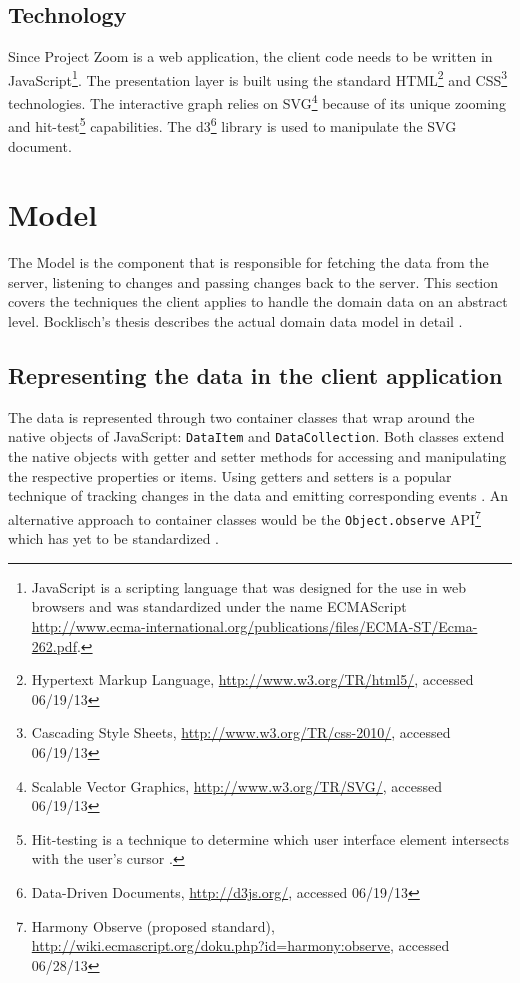 \subsection{Technology}
Since Project Zoom is a web application, the client code needs to be written in JavaScript\footnote{JavaScript is a scripting language that was designed for the use in web browsers and was standardized under the name ECMAScript \url{http://www.ecma-international.org/publications/files/ECMA-ST/Ecma-262.pdf}.}. The presentation layer is built using the standard HTML\footnote{Hypertext Markup Language, \url{http://www.w3.org/TR/html5/}, accessed 06/19/13} and CSS\footnote{Cascading Style Sheets, \url{http://www.w3.org/TR/css-2010/}, accessed 06/19/13} technologies. The interactive graph relies on SVG\footnote{Scalable Vector Graphics, \url{http://www.w3.org/TR/SVG/}, accessed 06/19/13} because of its unique zooming and hit-test\footnote{Hit-testing is a technique to determine which user interface element intersects with the user's cursor \cite{Foley_1995}.} capabilities. The d3\footnote{Data-Driven Documents, \url{http://d3js.org/}, accessed 06/19/13} library is used to manipulate the SVG document.

\section{Model}

The Model is the component that is responsible for fetching the data from the server, listening to changes and passing changes back to the server. This section covers the techniques the client applies to handle the domain data on an abstract level. Bocklisch's thesis describes the actual domain data model in detail \cite{Bocklisch_2013}.

\subsection{Representing the data in the client application}

The data is represented through two container classes that wrap around the native objects of Ja\-va\-Script: \texttt{DataItem} and \texttt{DataCollection}. Both classes extend the native objects with getter and setter methods for accessing and manipulating the respective properties or items. Using getters and setters is a popular technique of tracking changes in the data and emitting corresponding events \cite{Osmani_2013}. An alternative approach to container classes would be the \texttt{Object.observe} API\footnote{Harmony Observe (proposed standard), \url{http://wiki.ecmascript.org/doku.php?id=harmony:observe}, accessed 06/28/13} which has yet to be standardized \cite{Waldron_2012}.

